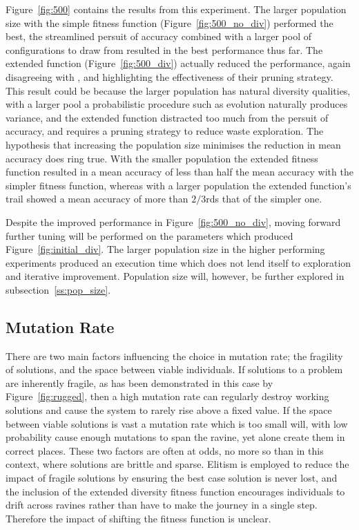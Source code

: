 Figure~\ref{fig:500} contains the results from this experiment. The larger
population size with the simple fitness function (Figure~\ref{fig:500_no_div})
performed the best, the
streamlined persuit of accuracy combined with a larger pool of configurations to
draw from resulted in the best performance thus far.  The extended function
(Figure~\ref{fig:500_div})
actually reduced the performance, again disagreeing with
\cite{deJong:2001:RBP:2955239.2955241}, and highlighting the
effectiveness of their pruning strategy. This result could be because
the larger population has natural diversity qualities, with a larger pool
a probabilistic procedure such as evolution naturally produces variance,
and the extended
function distracted too much from the persuit of accuracy, and requires a pruning
strategy to reduce waste exploration. The hypothesis
that increasing the population size minimises the reduction in mean accuracy
does ring true. With the smaller population the extended fitness function resulted in
a mean accuracy of less than half the mean accuracy with the simpler fitness function,
whereas
with a larger population the extended function's trail showed a mean accuracy of
more than
$2/3$rds that of the simpler one.

Despite the improved performance in Figure~\ref{fig:500_no_div}, moving forward
further tuning will be performed on the parameters which produced
Figure~\ref{fig:initial_div}. The larger population size in the higher performing experiments
produced an execution time which does not lend itself to exploration and
iterative improvement. Population size will, however, be further explored in
subsection~\ref{ss:pop_size}.

\subsection{Mutation Rate}

There are two main factors influencing the choice in mutation rate; the fragility
of solutions, and the space between viable individuals. If solutions to a problem are
inherently fragile, as has been demonstrated in this case by Figure~\ref{fig:rugged},
then a high
mutation rate can regularly destroy working solutions and cause the system to
rarely rise above a fixed value. If the space between viable solutions is vast
a mutation rate which is too small will, with low probability cause enough mutations to
span the ravine, yet alone create them in correct places. These two factors are
often at odds, no more so than in this context, where solutions are brittle and
sparse. Elitism is employed to reduce the impact of fragile solutions by ensuring
the best case solution is never lost, and the inclusion of the extended diversity
fitness function encourages individuals to drift across ravines rather than have
to make the journey in a single step. Therefore the impact of shifting the
fitness function is unclear.

